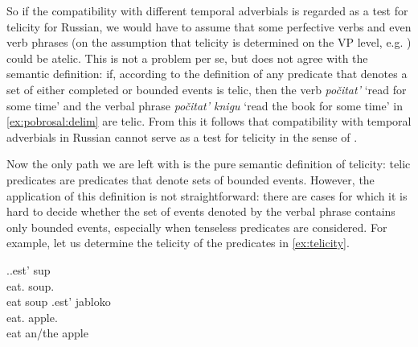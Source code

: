 So if the compatibility with different temporal adverbials is regarded as a test for telicity for Russian, we would have to assume that some perfective verbs and even verb phrases (on the assumption that telicity is determined on the VP level, e.g. \citealt{Borer:05}) could be atelic. This is not a problem per se, but does not agree with the semantic definition: if, according to the definition of \citet[3]{Rothstein:08a} any predicate that denotes a set of either completed or bounded events is telic, then the verb \textit{po\v{c}itat'} `read for some time' and the verbal phrase \textit{po\v{c}itat' knigu} `read the book for some time' in \ref{ex:pobrosal:delim} are telic. From this it follows that compatibility with temporal adverbials in Russian cannot serve as a test for telicity in the sense of \citet{Rothstein:08a}.




Now the only path we are left with is the pure semantic definition of telicity: telic predicates are predicates that denote sets of bounded events. However, the application of this definition is not straightforward: there are cases for which it is hard to decide whether the set of events denoted by the verbal phrase contains only bounded events, especially when tenseless predicates are considered. For example, let us determine the telicity of the predicates in \ref{ex:telicity}.

\ex.\label{ex:telicity}\ag.\label{ex:telicity:soup}est' sup\\
eat. soup.\\
eat soup
\bg.\label{ex:telicity:apple}est' jabloko\\
eat. apple.\\
eat an/the apple

